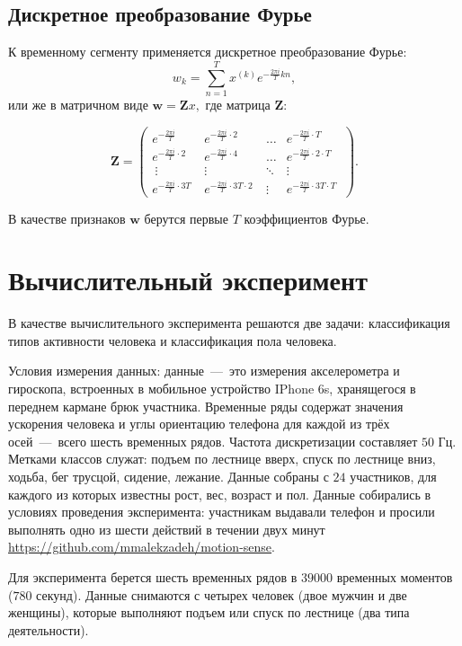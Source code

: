 \documentclass[12pt, twoside]{article}
\begin{document}
\subsection{ Дискретное преобразование Фурье}
К временному сегменту применяется дискретное преобразование Фурье:
$$w_k = \sum\limits_{n=1}^{T}x^{(k)}e^{-\frac{2\pi i}{T}kn},$$
или же в матричном виде $\mathbf{w} = \mathbf{Z}x,$ где матрица $\mathbf{Z}$:

\begin{equation*}
\mathbf{Z} = \left(
\begin{array}{cccc}
e^{-\frac{2\pi i}{T}} & e^{-\frac{2\pi i}{T}\cdot 2} & \ldots & e^{-\frac{2\pi i}{T}\cdot T}\\
e^{-\frac{2\pi i}{T}\cdot 2}\ & e^{-\frac{2\pi i}{T}\cdot 4}\ & \ldots & e^{-\frac{2\pi i}{T}\cdot 2\cdot T}\\\
\vdots & \vdots & \ddots & \vdots\\
e^{-\frac{2\pi i}{T}\cdot 3T}\ & e^{-\frac{2\pi i}{T}\cdot 3T\cdot 2}\ & \vdots & e^{-\frac{2\pi i}{T}\cdot 3T\cdot T}\
\end{array}
\right).
\end{equation*}

В качестве признаков $\mathbf{w}$ берутся первые $T$ коэффициентов Фурье.


\section{Вычислительный эксперимент}

В качестве вычислительного эксперимента решаются две задачи:  классификация типов активности человека и классификация пола человека. 

Условия измерения данных: данные~---~это измерения акселерометра и гироскопа, встроенных в мобильное устройство IPhone 6s, хранящегося в переднем кармане брюк участника. Временные ряды содержат значения ускорения человека и углы ориентацию телефона для каждой из трёх осей~---~всего шесть временных рядов. Частота дискретизации составляет $50$ Гц. Метками классов служат: подъем по лестнице вверх, спуск по лестнице вниз, ходьба, бег трусцой, сидение, лежание. Данные собраны с $24$ участников, для каждого из  которых известны рост, вес, возраст и пол. Данные собирались в условиях проведения эксперимента: участникам выдавали телефон и просили выполнять одно из шести действий в течении двух минут \url{https://github.com/mmalekzadeh/motion-sense}.

Для эксперимента берется шесть временных рядов в $39000$ временных моментов ($780$ секунд). Данные снимаются с четырех человек (двое мужчин и две женщины), которые выполняют подъем или спуск по лестнице (два типа деятельности).
\end{document}
